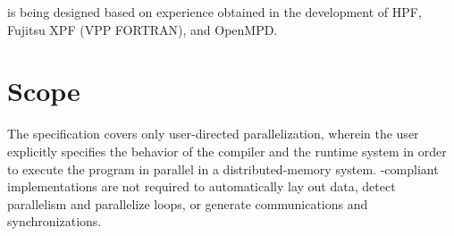 \begin{itemize}
%
%
%
%
%

\end{itemize}

{\XMP} is being designed based on experience obtained in the development
of HPF, Fujitsu XPF (VPP FORTRAN), and OpenMPD.  


\section{Scope}

The {\XMP} specification covers only user-directed parallelization,
wherein the user explicitly specifies the behavior of the compiler and
the runtime system in order to execute the program in parallel in a
distributed-memory system.
%
{\XMP}-compliant implementations are not required to automatically
lay out data, detect parallelism and parallelize loops, or generate
communications and synchronizations.

%


